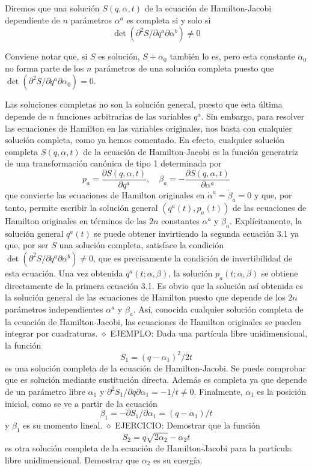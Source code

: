 Diremos que una solución $S(q, \alpha, t)$ de la ecuación de Hamilton-Jacobi dependiente de $n$ parámetros $\alpha^{a}$ es completa si y solo si
$$
\operatorname{det}\left(\partial^{2} S / \partial q^{a} \partial \alpha^{b}\right) \neq 0
$$

Conviene notar que, si $S$ es solución, $S+\alpha_{0}$ también lo es, pero esta constante $\alpha_{0}$ no forma parte de los $n$ parámetros de una solución completa puesto que $\operatorname{det}\left(\partial^{2} S / \partial q^{a} \partial \alpha_{0}\right)=0$.

Las soluciones completas no son la solución general, puesto que esta última depende de $n$ funciones arbitrarias de las variables $q^{a}$. Sin embargo, para resolver las ecuaciones de Hamilton en las variables originales, nos basta con cualquier solución completa, como ya hemos comentado. En efecto, cualquier
solución completa $S(q, \alpha, t)$ de la ecuación de Hamilton-Jacobi es la función generatriz de una transformación canónica de tipo 1 determinada por
$$
\begin{equation*}
p_{a}=\frac{\partial S(q, \alpha, t)}{\partial q^{a}}, \quad \beta_{a}=-\frac{\partial S(q, \alpha, t)}{\partial \alpha^{a}} \tag{3.1}
\end{equation*}
$$
que convierte las ecuaciones de Hamilton originales en $\dot{\alpha}^{a}=\dot{\beta}_{a}=0$ y que, por tanto, permite escribir la solución general $\left(q^{a}(t), p_{a}(t)\right)$ de las ecuaciones de Hamilton originales en términos de las $2 n$ constantes $\alpha^{a}$ y $\beta_{a}$. Explícitamente, la solución general $q^{a}(t)$ se puede obtener invirtiendo la segunda ecuación 3.1 ya que, por ser $S$ una solución completa, satisface la condición $\operatorname{det}\left(\partial^{2} S / \partial q^{a} \partial \alpha^{b}\right) \neq 0$, que es precisamente la condición de invertibilidad de esta ecuación. Una vez obtenida $q^{a}(t ; \alpha, \beta)$, la solución $p_{a}(t ; \alpha, \beta)$ se obtiene directamente de la primera ecuación 3.1. Es obvio que la solución así obtenida es la solución general de las ecuaciones de Hamilton puesto que depende de los $2 n$ parámetros independientes $\alpha^{a}$ y $\beta_{a}$. Así, conocida cualquier solución completa de la ecuación de Hamilton-Jacobi, las ecuaciones de Hamilton originales se pueden integrar por cuadraturas.
$\diamond$ EJEMPLO: Dada una partícula libre unidimensional, la función
$$
S_{1}=\left(q-\alpha_{1}\right)^{2} / 2 t
$$
es una solución completa de la ecuación de Hamilton-Jacobi. Se puede comprobar que es solución mediante sustitución directa. Además es completa ya que depende de un parámetro libre $\alpha_{1}$ y $\partial^{2} S_{1} / \partial q \partial \alpha_{1}=-1 / t \neq 0$. Finalmente, $\alpha_{1}$ es la posición inicial, como se ve a partir de la ecuación
$$
\beta_{1}=-\partial S_{1} / \partial \alpha_{1}=\left(q-\alpha_{1}\right) / t
$$
y $\beta_{1}$ es su momento lineal.
$\diamond$ EJERCICIO: Demostrar que la función
$$
S_{2}=q \sqrt{2 \alpha_{2}}-\alpha_{2} t
$$
es otra solución completa de la ecuación de Hamilton-Jacobi para la partícula libre unidimensional. Demostrar que $\alpha_{2}$ es su energía.

